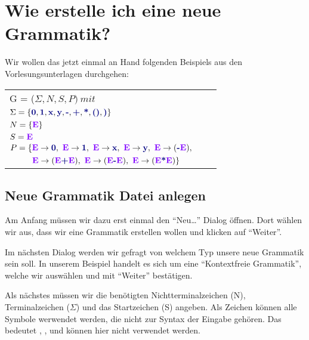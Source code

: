 \chapter{Wie erstelle ich eine neue Grammatik?}

Wir wollen das jetzt einmal an Hand folgenden Beispiels aus den
Vorlesungsunterlagen durchgehen:\vspace{10pt}


\begin{tabular}{lcr}
G = ($\Sigma, N, S, P )\ mit $\\
	$\Sigma = \{\TerminalSymbol{0}, \TerminalSymbol{1}, \TerminalSymbol{x},
	\TerminalSymbol{y}, \TerminalSymbol{-}, \TerminalSymbol{+},
	\TerminalSymbol{*}, \TerminalSymbol{()}, \TerminalSymbol{)}\}$\\ $N =
	\{\StartSymbol{E}\}$\\ $S=\StartSymbol{E}$\\ 
	$P = \{\StartSymbol{E} \to \TerminalSymbol{0},\ \StartSymbol{E} \to \TerminalSymbol{1},\ 
	\StartSymbol{E}	\to \TerminalSymbol{x},\ \StartSymbol{E} \to \TerminalSymbol{y},\ 
	\StartSymbol{E} \to (\TerminalSymbol{-}\StartSymbol{E}),$\\ 
	$\ \ \ \ \ \ \ \ \StartSymbol{E} \to (\StartSymbol{E} \TerminalSymbol{+}
	\StartSymbol{E}),\ \StartSymbol{E} \to (\StartSymbol{E} \TerminalSymbol{-} \StartSymbol{E}),\
	\StartSymbol{E} \to (\StartSymbol{E} \TerminalSymbol{*} \StartSymbol{E})\}$\\
\end{tabular}

\section{Neue Grammatik Datei anlegen}
 
Am Anfang müssen wir dazu erst einmal den "`Neu\ldots"' Dialog öffnen. Dort
wählen wir aus, dass wir eine Grammatik erstellen wollen und klicken auf
"`Weiter"'.\vspace{10pt}

Im nächsten Dialog werden wir gefragt von welchem Typ unsere neue Grammatik
sein soll. In unserem Beispiel handelt es sich um eine "`Kontextfreie
Grammatik"', welche wir auswählen und mit "`Weiter"' bestätigen.\vspace{10pt}

Als nächstes müssen wir die benötigten Nichtterminalzeichen (N),
Terminalzeichen ($\Sigma$) und das Startzeichen (S) angeben.  Als Zeichen
können alle Symbole werwendet werden, die nicht zur Syntax der Eingabe gehören.
Das bedeutet \Symbol{,}, \Symbol{\{}, \Symbol{\}} und \SymbolEmpty{}
können hier nicht verwendet werden.\vspace{10pt}

